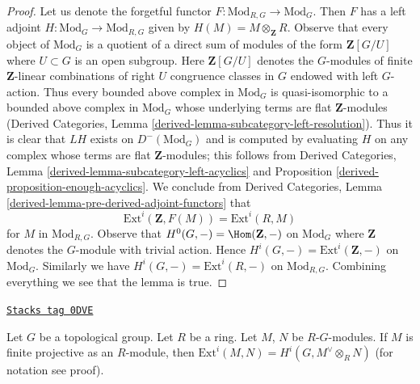 \begin{proof}
Let us denote the forgetful functor $F : \text{Mod}_{R, G} \to \text{Mod}_G$.
Then $F$ has a left adjoint $H : \text{Mod}_G \to \text{Mod}_{R, G}$
given by $H(M) = M \otimes_\mathbf{Z} R$. Observe that every object of
$\text{Mod}_G$ is a quotient of a direct sum of modules of the form
$\mathbf{Z}[G/U]$ where $U \subset G$ is an open subgroup.
Here $\mathbf{Z}[G/U]$ denotes the $G$-modules of
finite $\mathbf{Z}$-linear combinations
of right $U$ congruence classes in $G$ endowed with left $G$-action.
Thus every bounded above complex in $\text{Mod}_G$ is quasi-isomorphic
to a bounded above complex in $\text{Mod}_G$ whose underlying
terms are flat $\mathbf{Z}$-modules
(Derived Categories, Lemma \ref{derived-lemma-subcategory-left-resolution}).
Thus it is clear that $LH$ exists on $D^-(\text{Mod}_G)$ and is computed by
evaluating $H$ on any complex whose terms are flat $\mathbf{Z}$-modules;
this follows from
Derived Categories, Lemma \ref{derived-lemma-subcategory-left-acyclics} and
Proposition \ref{derived-proposition-enough-acyclics}.
We conclude from Derived Categories, Lemma
\ref{derived-lemma-pre-derived-adjoint-functors}
that
$$
\text{Ext}^i(\mathbf{Z}, F(M)) = \text{Ext}^i(R, M)
$$
for $M$ in $\text{Mod}_{R, G}$.
Observe that $H^0(G, -) = \Hom(\mathbf{Z}, -)$ on
$\text{Mod}_G$ where $\mathbf{Z}$ denotes the $G$-module
with trivial action. Hence
$H^i(G, -) = \text{Ext}^i(\mathbf{Z}, -)$ on $\text{Mod}_G$.
Similarly we have $H^i(G, -) = \text{Ext}^i(R, -)$ on
$\text{Mod}_{R, G}$. Combining everything we see that the lemma is true.
\end{proof}

\begin{lemma}
\label{etale-cohomology-lemma-ext-modules-hom}
\href{https://stacks.math.columbia.edu/tag/0DVE}{\texttt{Stacks tag 0DVE}}

Let $G$ be a topological group. Let $R$ be a ring.
Let $M$, $N$ be $R\text{-}G$-modules. If $M$ is finite projective
as an $R$-module, then
$\text{Ext}^i(M, N) = H^i(G, M^\vee \otimes_R N)$ (for notation
see proof).
\end{lemma}

